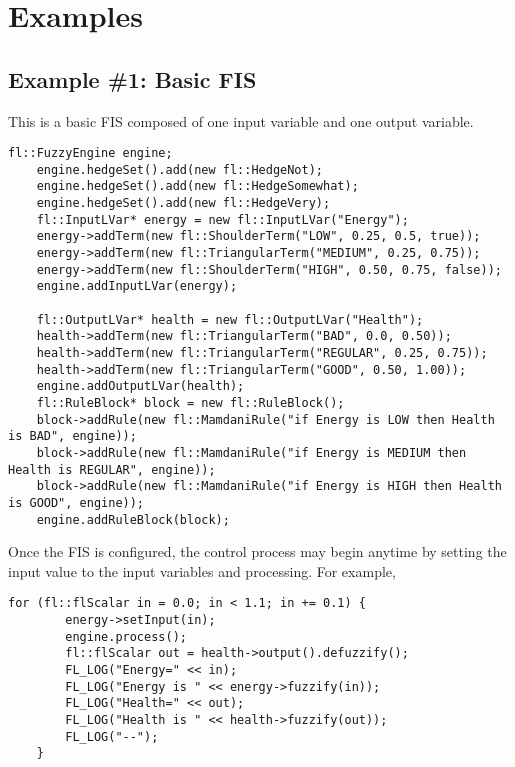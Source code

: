 	\chapter{Examples}
	\section{Example \#1: Basic FIS}
		This is a basic FIS composed of one input variable and one output variable.
	
	\begin{lstlisting}[firstnumber=1,tabsize=2]
	fl::FuzzyEngine engine;
	engine.hedgeSet().add(new fl::HedgeNot);
	engine.hedgeSet().add(new fl::HedgeSomewhat);
	engine.hedgeSet().add(new fl::HedgeVery);
	fl::InputLVar* energy = new fl::InputLVar("Energy");
	energy->addTerm(new fl::ShoulderTerm("LOW", 0.25, 0.5, true));
	energy->addTerm(new fl::TriangularTerm("MEDIUM", 0.25, 0.75));
	energy->addTerm(new fl::ShoulderTerm("HIGH", 0.50, 0.75, false));
	engine.addInputLVar(energy);

	fl::OutputLVar* health = new fl::OutputLVar("Health");
	health->addTerm(new fl::TriangularTerm("BAD", 0.0, 0.50));
	health->addTerm(new fl::TriangularTerm("REGULAR", 0.25, 0.75));
	health->addTerm(new fl::TriangularTerm("GOOD", 0.50, 1.00));
	engine.addOutputLVar(health);
	fl::RuleBlock* block = new fl::RuleBlock();
	block->addRule(new fl::MamdaniRule("if Energy is LOW then Health is BAD", engine));
	block->addRule(new fl::MamdaniRule("if Energy is MEDIUM then Health is REGULAR", engine));
	block->addRule(new fl::MamdaniRule("if Energy is HIGH then Health is GOOD", engine));
	engine.addRuleBlock(block);

	\end{lstlisting}
	
	Once the FIS is configured, the control process may begin anytime by setting the input value to the input variables and processing. For example,
	
	\begin{lstlisting}[firstnumber=last,tabsize=2]
	for (fl::flScalar in = 0.0; in < 1.1; in += 0.1) {
	    energy->setInput(in);
	    engine.process();
	    fl::flScalar out = health->output().defuzzify();
	    FL_LOG("Energy=" << in);
	    FL_LOG("Energy is " << energy->fuzzify(in));
	    FL_LOG("Health=" << out);
	    FL_LOG("Health is " << health->fuzzify(out));
	    FL_LOG("--");
	}
	\end{lstlisting}
	
